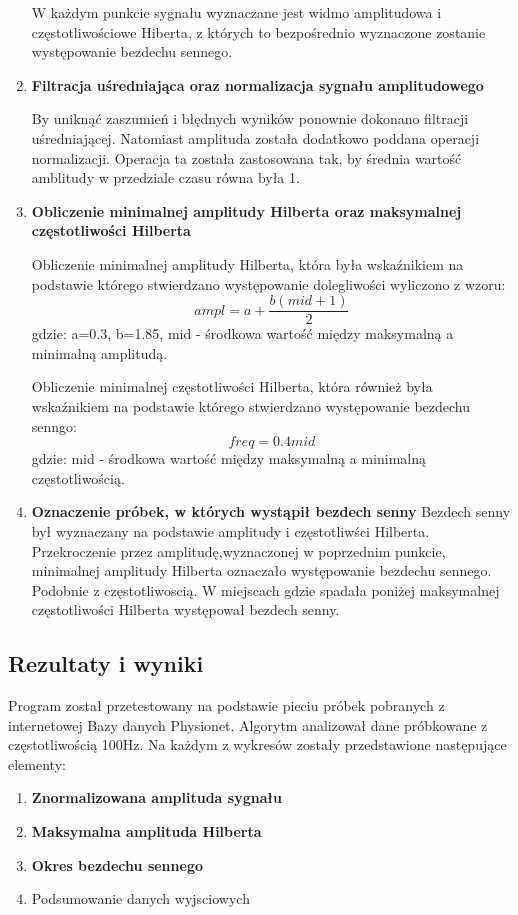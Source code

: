 \begin{enumerate}
 W każdym punkcie sygnału wyznaczane jest widmo amplitudowa i częstotliwościowe Hiberta, z których to bezpośrednio wyznaczone zostanie występowanie bezdechu sennego.
 \item \textbf{Filtracja uśredniająca oraz normalizacja sygnału amplitudowego}
 
 By uniknąć zaszumień i błędnych wyników ponownie dokonano filtracji uśredniającej. Natomiast amplituda została dodatkowo poddana operacji normalizacji. Operacja ta została zastosowana tak, by średnia wartość amblitudy w przedziale czasu równa była 1.
 \item \textbf{Obliczenie minimalnej amplitudy Hilberta oraz maksymalnej częstotliwości Hilberta}
 
 Obliczenie minimalnej amplitudy Hilberta, która była wskaźnikiem na podstawie którego stwierdzano występowanie dolegliwości wyliczono z wzoru:
 \begin{equation}
 ampl = a+\frac{b(mid +1)}{2}
 \end{equation}
  gdzie: a=0.3, b=1.85, mid - środkowa wartość między maksymalną a minimalną amplitudą.
  
 Obliczenie minimalnej częstotliwości Hilberta, która również była wskaźnikiem na podstawie którego stwierdzano występowanie bezdechu senngo:
 \begin{equation}
 freq = 0.4mid
 \end{equation}
  gdzie: mid - środkowa wartość między maksymalną a minimalną częstotliwością.
 \item \textbf{Oznaczenie próbek, w których wystąpił bezdech senny}
 Bezdech senny był wyznaczany na podstawie amplitudy i częstotliwści Hilberta. Przekroczenie przez amplitudę,wyznaczonej w poprzednim punkcie, minimalnej amplitudy Hilberta oznaczało występowanie bezdechu sennego. Podobnie z częstotliwoscią. W miejscach gdzie spadała poniżej maksymalnej częstotliwości Hilberta występował bezdech senny.
\end{enumerate}

\subsection{Rezultaty i wyniki}
Program został przetestowany na podstawie pieciu próbek pobranych z internetowej Bazy danych Physionet. Algorytm analizował dane próbkowane z częstotliwością 100Hz.
Na każdym z wykresów zostały przedstawione następujące elementy:
\begin{enumerate}
 \item \textbf {\color{blue}Znormalizowana amplituda sygnału}
 \item \textbf {\color{black}Maksymalna amplituda Hilberta}
 \item \textbf {\color{red}Okres bezdechu sennego}
 \item {Podsumowanie danych wyjsciowych}
\end{enumerate}


